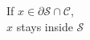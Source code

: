 \documentclass[preview]{standalone}
\begin{document}
\begin{center}
If $x \in \partial \mathcal{S} \cap \mathcal{C}$,\\$x$ stays inside $\mathcal{S}$
\end{center}
\end{document}
